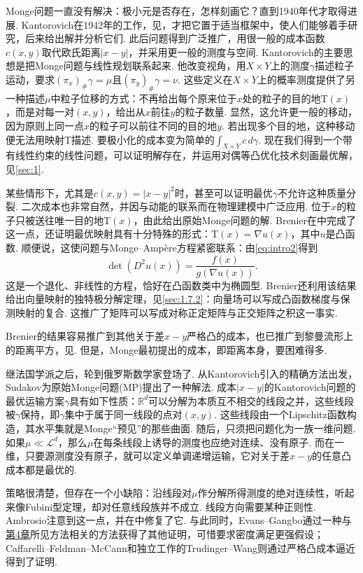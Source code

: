 Monge问题一直没有解决：极小元是否存在，怎样刻画它？直到1940年代才取得进展. Kantorovich在1942年的工作，见\cite{b200}，才把它置于适当框架中，使人们能够着手研究，后来给出解并分析它们. 此后问题得到广泛推广，用很一般的成本函数$c(x,y)$取代欧氏距离$|x-y|$，并采用更一般的测度与空间. Kantorovich的主要思想是把Monge问题与线性规划联系起来. 他改变视角，用$X\times Y$上的测度$\gamma$描述粒子运动，要求$(\pi_x)_\#\gamma=\mu$且$(\pi_y)_\#\gamma=\nu$. 这些定义在$X\times Y$上的概率测度提供了另一种描述$\mu$中粒子位移的方式：不再给出每个原来位于$x$处的粒子的目的地$\mathrm{T}(x)$，而是对每一对$(x,y)$，给出从$x$前往$y$的粒子数量. 显然，这允许更一般的移动，因为原则上同一点$x$的粒子可以前往不同的目的地$y$. 若出现多个目的地，这种移动便无法用映射$\mathrm{T}$描述. 要极小化的成本变为简单的$\int_{X\times Y}c\,d\gamma$. 现在我们得到一个带有线性约束的线性问题，可以证明解存在，并运用对偶等凸优化技术刻画最优解，见\autoref{sec:1}.

某些情形下，尤其是$c(x,y)=|x-y|^2$时，甚至可以证明最优$\gamma$不允许这种质量分裂. 二次成本也非常自然，并因与动能的联系而在物理建模中广泛应用. 位于$x$的粒子只被送往唯一目的地$\mathrm{T}(x)$，由此给出原始Monge问题的解. Brenier在\cite{b82}中完成了这一点，还证明最优映射具有十分特殊的形式：$\mathrm{T}(x)=\nabla u(x)$，其中$u$是凸函数. 顺便说，这使问题与Monge--Ampère方程紧密联系：由\eqref{eq:intro2}得到
\[
\det(D^2u(x))=\frac{f(x)}{g(\nabla u(x))}.
\]
这是一个退化、非线性的方程，恰好在凸函数类中为椭圆型. Brenier还利用该结果给出向量映射的独特极分解定理，见\autoref{sec:1.7.2}：向量场可以写成凸函数梯度与保测映射的复合. 这推广了矩阵可以写成对称正定矩阵与正交矩阵之积这一事实.

Brenier的结果容易推广到其他关于差$x-y$严格凸的成本，也已推广到黎曼流形上的距离平方，见\cite{b231}. 但是，Monge最初提出的成本，即距离本身，要困难得多.

继法国学派之后，轮到俄罗斯数学家登场了. 从Kantorovich引入的精确方法出发，Sudakov\cite{b290}为原始Monge问题(MP)提出了一种解法. 成本$|x-y|$的Kantorovich问题的最优运输方案$\gamma$具有如下性质：$\mathbb R^d$可以分解为本质互不相交的线段之并，这些线段被$\gamma$保持，即$\gamma$集中于属于同一线段的点对$(x,y)$. 这些线段由一个Lipschitz函数构造，其水平集就是Monge“预见”的那些曲面. 随后，只须把问题化为一族一维问题. 如果$\mu\ll\mathscr L^d$，那么$\mu$在每条线段上诱导的测度也应绝对连续、没有原子. 而在一维，只要源测度没有原子，就可以定义单调递增运输，它对关于差$x-y$的任意凸成本都是最优的.

策略很清楚，但存在一个小缺陷：沿线段对$\mu$作分解所得测度的绝对连续性，听起来像Fubini型定理，却对任意线段族并不成立. 线段方向需要某种正则性. Ambrosio注意到这一点，并在\cite{b8,b10}中修复了它. 与此同时，Evans--Gangbo\cite{b159}通过一种与\hyperref[sec:4]{第4章}所见方法相关的方法获得了其他证明，可惜要求密度满足更强假设；Caffarelli--Feldman--McCann\cite{b101}和独立工作的Trudinger--Wang\cite{b291}则通过严格凸成本逼近得到了证明.

